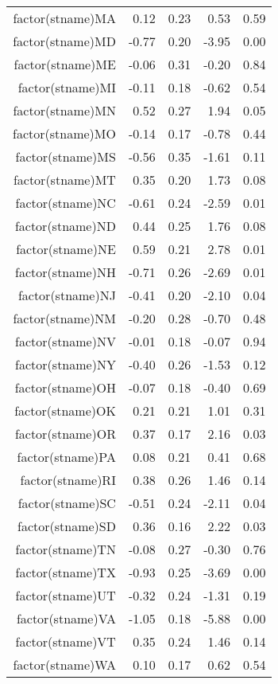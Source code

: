 \begin{table}[ht]
\begin{tabular}{rrrrr}
  factor(stname)MA & 0.12 & 0.23 & 0.53 & 0.59 \\ 
  factor(stname)MD & -0.77 & 0.20 & -3.95 & 0.00 \\ 
  factor(stname)ME & -0.06 & 0.31 & -0.20 & 0.84 \\ 
  factor(stname)MI & -0.11 & 0.18 & -0.62 & 0.54 \\ 
  factor(stname)MN & 0.52 & 0.27 & 1.94 & 0.05 \\ 
  factor(stname)MO & -0.14 & 0.17 & -0.78 & 0.44 \\ 
  factor(stname)MS & -0.56 & 0.35 & -1.61 & 0.11 \\ 
  factor(stname)MT & 0.35 & 0.20 & 1.73 & 0.08 \\ 
  factor(stname)NC & -0.61 & 0.24 & -2.59 & 0.01 \\ 
  factor(stname)ND & 0.44 & 0.25 & 1.76 & 0.08 \\ 
  factor(stname)NE & 0.59 & 0.21 & 2.78 & 0.01 \\ 
  factor(stname)NH & -0.71 & 0.26 & -2.69 & 0.01 \\ 
  factor(stname)NJ & -0.41 & 0.20 & -2.10 & 0.04 \\ 
  factor(stname)NM & -0.20 & 0.28 & -0.70 & 0.48 \\ 
  factor(stname)NV & -0.01 & 0.18 & -0.07 & 0.94 \\ 
  factor(stname)NY & -0.40 & 0.26 & -1.53 & 0.12 \\ 
  factor(stname)OH & -0.07 & 0.18 & -0.40 & 0.69 \\ 
  factor(stname)OK & 0.21 & 0.21 & 1.01 & 0.31 \\ 
  factor(stname)OR & 0.37 & 0.17 & 2.16 & 0.03 \\ 
  factor(stname)PA & 0.08 & 0.21 & 0.41 & 0.68 \\ 
  factor(stname)RI & 0.38 & 0.26 & 1.46 & 0.14 \\ 
  factor(stname)SC & -0.51 & 0.24 & -2.11 & 0.04 \\ 
  factor(stname)SD & 0.36 & 0.16 & 2.22 & 0.03 \\ 
  factor(stname)TN & -0.08 & 0.27 & -0.30 & 0.76 \\ 
  factor(stname)TX & -0.93 & 0.25 & -3.69 & 0.00 \\ 
  factor(stname)UT & -0.32 & 0.24 & -1.31 & 0.19 \\ 
  factor(stname)VA & -1.05 & 0.18 & -5.88 & 0.00 \\ 
  factor(stname)VT & 0.35 & 0.24 & 1.46 & 0.14 \\ 
  factor(stname)WA & 0.10 & 0.17 & 0.62 & 0.54 \\ 

\end{tabular}
\end{table}
